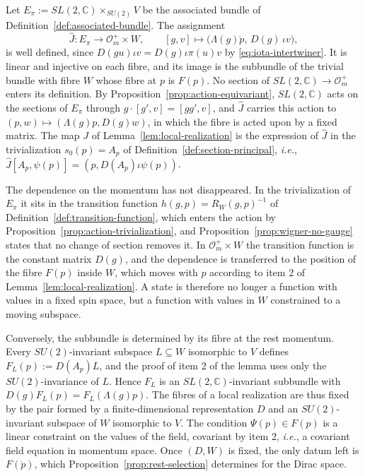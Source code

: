 \begin{remark}\label{rem:local-subbundle}
	Let $E_\pi:=SL(2,\mathbb{C})\times_{SU(2)}V$ be the associated bundle of Definition~\ref{def:associated-bundle}. The assignment
	\begin{equation*}
		\widehat{J}:E_\pi\to\mathcal{O}_m^+\times W,\qquad[g,v]\mapsto\big(\Lambda(g)\mathring{p},\,D(g)\,\iota v\big),
	\end{equation*}
	is well defined, since $D(gu)\iota v=D(g)\iota\pi(u)v$ by \eqref{eq:iota-intertwiner}. It is linear and injective on each fibre, and its image is the subbundle of the trivial bundle with fibre $W$ whose fibre at $p$ is $F(p)$. No section of $SL(2,\mathbb{C})\to\mathcal{O}_m^+$ enters its definition. By Proposition~\ref{prop:action-equivariant}, $SL(2,\mathbb{C})$ acts on the sections of $E_\pi$ through $g\cdot[g',v]=[gg',v]$, and $\widehat{J}$ carries this action to $(p,w)\mapsto(\Lambda(g)p,D(g)w)$, in which the fibre is acted upon by a fixed matrix. The map $J$ of Lemma~\ref{lem:local-realization} is the expression of $\widehat{J}$ in the trivialization $s_0(p)=A_p$ of Definition~\ref{def:section-principal}, \textit{i.e.}, $\widehat{J}[A_p,\psi(p)]=(p,D(A_p)\iota\psi(p))$.
	
	The dependence on the momentum has not disappeared. In the trivialization of $E_\pi$ it sits in the transition function $h(g,p)=R_W(g,p)^{-1}$ of Definition~\ref{def:transition-function}, which enters the action by Proposition~\ref{prop:action-trivialization}, and Proposition~\ref{prop:wigner-no-gauge} states that no change of section removes it. In $\mathcal{O}_m^+\times W$ the transition function is the constant matrix $D(g)$, and the dependence is transferred to the position of the fibre $F(p)$ inside $W$, which moves with $p$ according to item 2 of Lemma~\ref{lem:local-realization}. A state is therefore no longer a function with values in a fixed spin space, but a function with values in $W$ constrained to a moving subspace.
	
	Conversely, the subbundle is determined by its fibre at the rest momentum. Every $SU(2)$-invariant subspace $L\subseteq W$ isomorphic to $V$ defines $F_L(p):=D(A_p)L$, and the proof of item 2 of the lemma uses only the $SU(2)$-invariance of $L$. Hence $F_L$ is an $SL(2,\mathbb{C})$-invariant subbundle with $D(g)F_L(p)=F_L(\Lambda(g)p)$. The fibres of a local realization are thus fixed by the pair formed by a finite-dimensional representation $D$ and an $SU(2)$-invariant subspace of $W$ isomorphic to $V$. The condition $\Psi(p)\in F(p)$ is a linear constraint on the values of the field, covariant by item 2, \textit{i.e.}, a covariant field equation in momentum space. Once $(D,W)$ is fixed, the only datum left is $F(\mathring{p})$, which Proposition~\ref{prop:rest-selection} determines for the Dirac space.
\end{remark}

